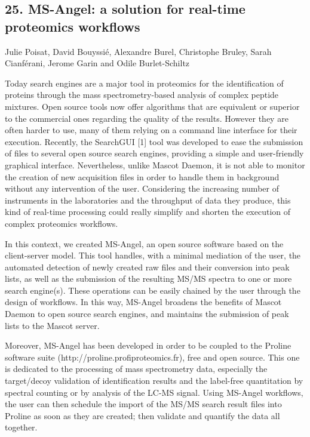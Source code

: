 \subsection*{\color{eubicRed} 25. MS-Angel: a solution for real-time proteomics workflows}
{\color{eubicGray}Julie Poisat, David Bouyssié, Alexandre Burel, Christophe Bruley, Sarah Cianférani, Jerome Garin and Odile Burlet-Schiltz}

Today search engines are a major tool in proteomics for the identification of proteins through the mass spectrometry-based analysis of complex peptide mixtures. Open source tools now offer algorithms that are equivalent or superior to the commercial ones regarding the quality of the results. However they are often harder to use, many of them relying on a command line interface for their execution. Recently, the SearchGUI [1] tool was developed to ease the submission of files to several open source search engines, providing a simple and user-friendly graphical interface. Nevertheless, unlike Mascot Daemon, it is not able to monitor the creation of new acquisition files in order to handle them in background without any intervention of the user. Considering the increasing number of instruments in the laboratories and the throughput of data they produce, this kind of real-time processing could really simplify and shorten the execution of complex proteomics workflows.

In this context, we created MS-Angel, an open source software based on the client-server model. This tool handles, with a minimal mediation of the user, the automated detection of newly created raw files and their conversion into peak lists, as well as the submission of the resulting MS/MS spectra to one or more search engine(s). These operations can be easily chained by the user through the design of workflows. In this way, MS-Angel broadens the benefits of Mascot Daemon to open source search engines, and maintains the submission of peak lists to the Mascot server.

Moreover, MS-Angel has been developed in order to be coupled to the Proline software suite (http://proline.profiproteomics.fr), free and open source. This one is dedicated to the processing of mass spectrometry data, especially the target/decoy validation of identification results and the label-free quantitation by spectral counting or by analysis of the LC-MS signal. Using MS-Angel workflows, the user can then schedule the import of the MS/MS search result files into Proline as soon as they are created; then validate and quantify the data all together.

